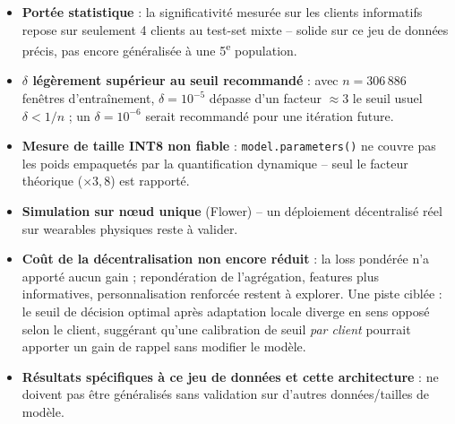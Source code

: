 \documentclass{acmart}
\begin{document}
\begin{itemize}
\item \textbf{Portée statistique} : la significativité mesurée sur les clients
informatifs repose sur seulement 4 clients au test-set mixte -- solide sur ce jeu de
données précis, pas encore généralisée à une 5\textsuperscript{e} population.
\item \textbf{$\delta$ légèrement supérieur au seuil recommandé} : avec
$n=306\,886$ fenêtres d'entraînement, $\delta=10^{-5}$ dépasse d'un facteur
$\approx3$ le seuil usuel $\delta<1/n$ ; un $\delta=10^{-6}$ serait recommandé pour
une itération future.
\item \textbf{Mesure de taille INT8 non fiable} : \texttt{model.parameters()} ne
couvre pas les poids empaquetés par la quantification dynamique -- seul le facteur
théorique ($\times3{,}8$) est rapporté.
\item \textbf{Simulation sur nœud unique} (Flower) -- un déploiement décentralisé réel
sur wearables physiques reste à valider.
\item \textbf{Coût de la décentralisation non encore réduit} : la loss pondérée n'a
apporté aucun gain ; repondération de l'agrégation, features plus informatives,
personnalisation renforcée restent à explorer. Une piste ciblée : le seuil de décision
optimal après adaptation locale diverge en sens opposé selon le client, suggérant
qu'une calibration de seuil \emph{par client} pourrait apporter un gain de rappel sans
modifier le modèle.
\item \textbf{Résultats spécifiques à ce jeu de données et cette architecture} : ne
doivent pas être généralisés sans validation sur d'autres données/tailles de modèle.
\end{itemize}

\bigskip
{}

\printbibliography
\end{document}
